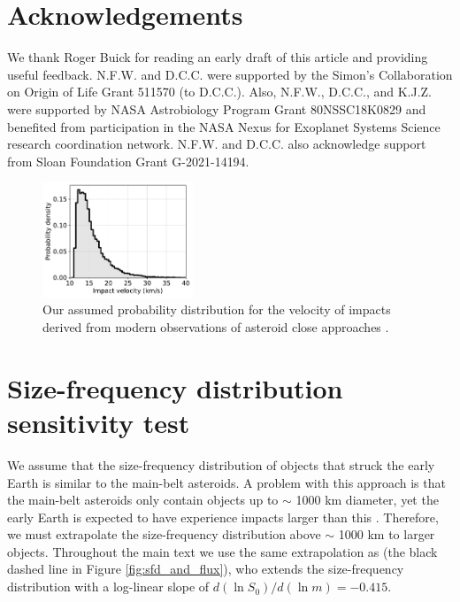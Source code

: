 \documentclass[manuscript]{aastex63}
\begin{document}
\section*{Acknowledgements}

We thank Roger Buick for reading an early draft of this article and providing useful feedback. N.F.W. and D.C.C. were supported by the Simon's Collaboration on Origin of Life Grant 511570 (to D.C.C.). Also, N.F.W., D.C.C., and K.J.Z. were supported by NASA Astrobiology Program Grant 80NSSC18K0829 and benefited from participation in the NASA Nexus for Exoplanet Systems Science research coordination network. N.F.W. and D.C.C. also acknowledge support from Sloan Foundation Grant G-2021-14194.

\appendix

\renewcommand{\thefigure}{A\arabic{figure}}
\renewcommand{\thetable}{A\arabic{table}}
\setcounter{figure}{0}
\setcounter{table}{0}

\begin{figure}
  \centering
  \includegraphics[width=0.4\textwidth]{figures/velocity_distribution.pdf}
  \caption{Our assumed probability distribution for the velocity of impacts derived from modern observations of asteroid close approaches \citep{Park_2023}.}
  \label{fig:velocity_distribution}
\end{figure}

\section{Size-frequency distribution sensitivity test} \label{sec:append_sfd}

We assume that the size-frequency distribution of objects that struck the early Earth is similar to the main-belt asteroids. A problem with this approach is that the main-belt asteroids only contain objects up to $\sim$ 1000 km diameter, yet the early Earth is expected to have experience impacts larger than this \citep{Marchi_2014}. Therefore, we must extrapolate the size-frequency distribution above $\sim$ 1000 km to larger objects. Throughout the main text we use the same extrapolation as \citet{Marchi_2014} (the black dashed line in Figure \ref{fig:sfd_and_flux}), who extends the size-frequency distribution with a log-linear slope of $d (\ln S_0)/d (\ln m) = - 0.415$.
\end{document}
